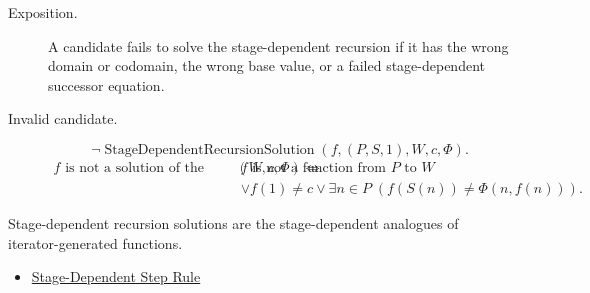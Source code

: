 \begin{remark*}
\begin{description}
  \item[Exposition.]
  A candidate fails to solve the stage-dependent recursion if it has the wrong
  domain or codomain, the wrong base value, or a failed stage-dependent
  successor equation.
  \item[Invalid candidate.]
  \[
  \neg\operatorname{StageDependentRecursionSolution}(f,(P,S,1),W,c,\Phi).
  \]
  \[
  \begin{aligned}
  f \text{ is not a solution of the stage-dependent recursion determined by } (W,c,\Phi)
  \Longleftrightarrow\;&
  f \text{ is not a function from } P \text{ to } W\\
  &\lor f(1)\neq c
  \lor \exists n\in P\;(f(S(n))\neq \Phi(n,f(n))).
  \end{aligned}
  \]
\end{description}
\end{remark*}

\begin{remark*}[Interpretation]
Stage-dependent recursion solutions are the stage-dependent analogues of
iterator-generated functions.
\end{remark*}

\begin{dependencies}
\begin{itemize}
  \item \hyperref[def:stage-dependent-step-rule]{Stage-Dependent Step Rule}
\end{itemize}
\end{dependencies}

